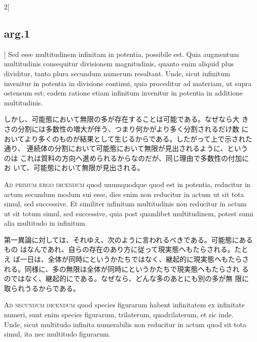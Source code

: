 \documentclass[paper=a4paper,fontsize=10pt,jafontsize=9pt,titlepage]{jlreq}
\begin{document}
\begin{paracol}{2}[\subsection{arg.1}]
Sed esse multitudinem infinitam in potentia, possibile est. Quia
 augmentum multitudinis consequitur divisionem magnitudinis, quanto enim
 aliquid plus dividitur, tanto plura secundum numerum resultant. Unde,
 sicut infinitum invenitur in potentia in divisione continui, quia
 proceditur ad materiam, ut supra ostensum est; eadem ratione etiam
 infinitum invenitur in potentia in additione multitudinis.

\switchcolumn

しかし、可能態において無限の多が存在することは可能である。なぜなら大
 きさの分割には多数性の増大が伴う、つまり何かがより多く分割されるだけ数
 においてより多くのものが結果として生じるからである。したがって上で示された通り、
 連続体の分割において可能態において無限が見出されるように、というのは
 これは質料の方向へ進められるからなのだが、同じ理由で多数性の付加にお
 いて、可能態において無限が見出される。

\switchcolumn*[\subsection{ad.1}]

{\scshape Ad primum ergo dicendum} quod unumquodque quod est in potentia,
 reducitur in actum secundum modum sui esse, dies enim non reducitur in
 actum ut sit tota simul, sed successive. Et similiter infinitum
 multitudinis non reducitur in actum ut sit totum simul, sed successive,
 quia post quamlibet multitudinem, potest sumi alia multitudo in
 infinitum.

\switchcolumn

第一異論に対しては、それゆえ、次のように言われるべきである。可能態にあるもの
 はなんであれ、自らの存在のあり方に従って現実態ヘもたらされる。たとえ
 ば一日は、全体が同時にというかたちではなく、継起的に現実態ヘもたらさ
 れる。同様に、多の無限は全体が同時にというかたちで現実態ヘもたらされ
 るのではなく、継起的にである。なぜなら、どんな多のあとにも別の多が無
 限に取られうるからである。

\switchcolumn*[\subsection{ad.2}]

{\scshape Ad secundum dicendum} quod species figurarum habent infinitatem ex
 infinitate numeri, sunt enim species figurarum, trilaterum,
 quadrilaterum, et sic inde. Unde, sicut multitudo infinita numerabilis
 non reducitur in actum quod sit tota simul, ita nec multitudo
 figurarum.


\end{paracol}
\end{document}
